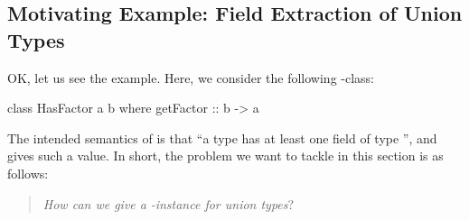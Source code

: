\documentclass[demotion-paper.tex]{subfiles}
\begin{document}
\subsection{Motivating Example: Field Extraction of Union Types}
OK, let us see the example.
Here, we consider the following -class:

\begin{code}
class HasFactor a b where
  getFactor :: b -> a
\end{code}

The intended semantics of  is that ``a type  has at least one field of type '', and  gives such a value.
In short, the problem we want to tackle in this section is as follows:
\begin{quote}
  \emph{How can we give a} \emph{-instance for union types}?
\end{quote}
\end{document}
